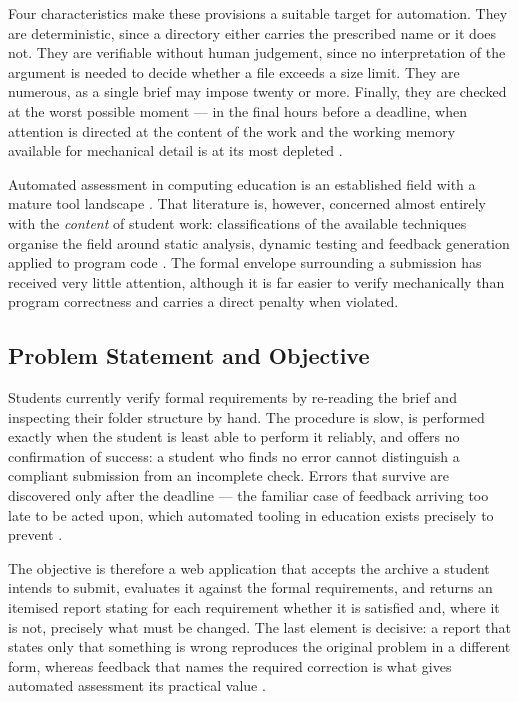 \documentclass[a4paper,11pt]{article}
\begin{document}
Four characteristics make these provisions a suitable target for automation.
They are deterministic, since a directory either carries the prescribed name or
it does not. They are verifiable without human judgement, since no
interpretation of the argument is needed to decide whether a file exceeds a size
limit. They are numerous, as a single brief may impose twenty or more. Finally,
they are checked at the worst possible moment --- in the final hours before a
deadline, when attention is directed at the content of the work and the working
memory available for mechanical detail is at its most depleted
\citep{Hermans2021}.

Automated assessment in computing education is an established field with a
mature tool landscape \citep{Messer2024}. That literature is, however, concerned
almost entirely with the \textit{content} of student work: classifications of
the available techniques organise the field around static analysis, dynamic
testing and feedback generation applied to program code \citep{Combefis2022}.
The formal envelope surrounding a submission has received very little attention,
although it is far easier to verify mechanically than program correctness and
carries a direct penalty when violated.

\subsection{Problem Statement and Objective}\label{subsec:problem}

Students currently verify formal requirements by re-reading the brief and
inspecting their folder structure by hand. The procedure is slow, is performed
exactly when the student is least able to perform it reliably, and offers no
confirmation of success: a student who finds no error cannot distinguish a
compliant submission from an incomplete check. Errors that survive are
discovered only after the deadline --- the familiar case of feedback arriving
too late to be acted upon, which automated tooling in education exists precisely
to prevent \citep{Messer2024}.

The objective is therefore a web application that accepts the archive a student
intends to submit, evaluates it against the formal requirements, and returns an
itemised report stating for each requirement whether it is satisfied and, where
it is not, precisely what must be changed. The last element is decisive: a
report that states only that something is wrong reproduces the original problem
in a different form, whereas feedback that names the required correction is what
gives automated assessment its practical value \citep{Combefis2022}.
\end{document}
